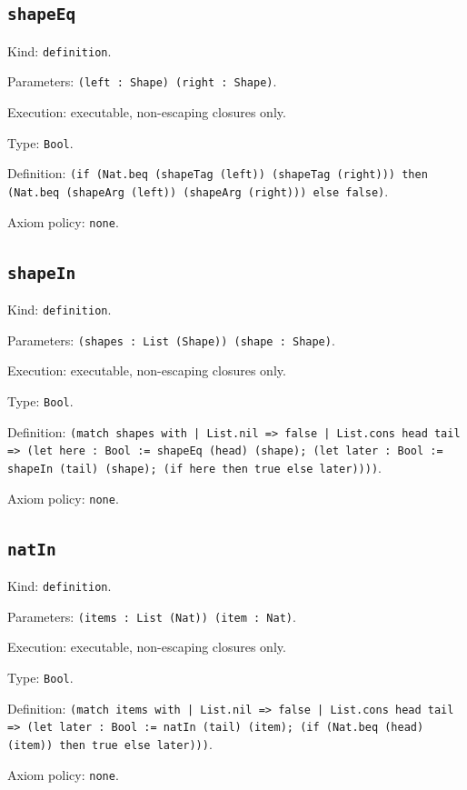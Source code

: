 \documentclass[11pt]{article}
\begin{document}
\subsection*{\texttt{shapeEq}}
\noindent Kind: \texttt{definition}.\par
\noindent Parameters: \texttt{(left : Shape) (right : Shape)}.\par
\noindent Execution: executable, non-escaping closures only.\par
\noindent Type: \texttt{Bool}.\par
\noindent Definition: \texttt{(if (Nat.beq (shapeTag (left)) (shapeTag (right))) then (Nat.beq (shapeArg (left)) (shapeArg (right))) else false)}.\par
\noindent Axiom policy: \texttt{none}.\par
\subsection*{\texttt{shapeIn}}
\noindent Kind: \texttt{definition}.\par
\noindent Parameters: \texttt{(shapes : List (Shape)) (shape : Shape)}.\par
\noindent Execution: executable, non-escaping closures only.\par
\noindent Type: \texttt{Bool}.\par
\noindent Definition: \texttt{(match shapes with | List.nil => false | List.cons head tail => (let here : Bool := shapeEq (head) (shape); (let later : Bool := shapeIn (tail) (shape); (if here then true else later))))}.\par
\noindent Axiom policy: \texttt{none}.\par
\subsection*{\texttt{natIn}}
\noindent Kind: \texttt{definition}.\par
\noindent Parameters: \texttt{(items : List (Nat)) (item : Nat)}.\par
\noindent Execution: executable, non-escaping closures only.\par
\noindent Type: \texttt{Bool}.\par
\noindent Definition: \texttt{(match items with | List.nil => false | List.cons head tail => (let later : Bool := natIn (tail) (item); (if (Nat.beq (head) (item)) then true else later)))}.\par
\noindent Axiom policy: \texttt{none}.\par
\end{document}
